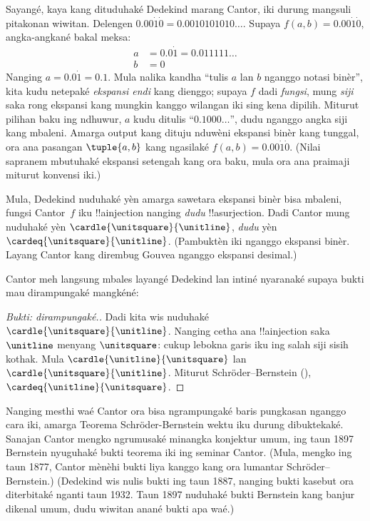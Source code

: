 \documentclass[../../../include/open-logic-section]{subfiles}
\begin{document}
Sayangé, kaya kang dituduhaké
Dedekind marang Cantor, iki
durung mangsuli pitakonan
wiwitan. Delengen $0.00\dot{1}\dot{0} =
0.0010101010\ldots$.
Supaya $f(a,b) = 0.00\dot{1}\dot{0}$,
angka-angkané bakal meksa:
\begin{align*}
a&= 0.0\dot{1} = 0.011111\ldots\\
b&= 0
\end{align*}
Nanging $a = 0.0\dot{1} = 0.1$.
Mula nalika kandha ``tulis
$a$ lan $b$ nganggo notasi
binèr'', kita kudu netepaké
\emph{ekspansi endi} kang
dienggo; supaya $f$ dadi
\emph{fungsi}, mung
\emph{siji} saka rong
ekspansi kang mungkin
kanggo wilangan iki
sing kena dipilih.
Miturut pilihan baku
ing ndhuwur, $a$
kudu ditulis
``$0.1000\ldots$'',
dudu nganggo angka siji
kang mbaleni. Amarga
output kang dituju
nduwèni ekspansi
binèr kang tunggal,
ora ana pasangan
$\tuple{a, b}$ kang
ngasilaké
$f(a, b) = 0.00\dot{1}\dot{0}$.
(Nilai sapranem mbutuhaké ekspansi setengah kang ora baku, mula ora ana praimaji miturut konvensi iki.)

Mula, Dedekind nuduhaké
yèn amarga sawetara
ekspansi binèr bisa
mbaleni, fungsi
Cantor~$f$ iku
!!a{injection}
nanging \emph{dudu}
!!a{surjection}.
Dadi Cantor mung
nuduhaké yèn
$\cardle{\unitsquare}{\unitline}$,
\emph{dudu} yèn
$\cardeq{\unitsquare}{\unitline}$.
(Pambuktèn iki nganggo ekspansi binèr. Layang Cantor kang dirembug Gouvea nganggo ekspansi desimal.)

Cantor meh langsung mbales
layangé Dedekind lan
intiné nyaranaké
supaya bukti mau
dirampungaké mangkéné:

\begin{proof}[Bukti: dirampungaké.]
Dadi kita wis nuduhaké
$\cardle{\unitsquare}{\unitline}$.
Nanging cetha ana
!!a{injection} saka
$\unitline$ menyang
$\unitsquare$: cukup
lebokna garis iku
ing salah siji sisih
kothak. Mula
$\cardle{\unitline}{\unitsquare}$ lan
$\cardle{\unitsquare}{\unitline}$. Miturut Schr\"{o}der--Bernstein
(),
$\cardeq{\unitline}{\unitsquare}$.
\end{proof}

Nanging mesthi waé Cantor ora
bisa ngrampungaké baris
pungkasan nganggo cara iki,
amarga Teorema
Schr\"{o}der-Bernstein
wektu iku durung dibuktekaké.
Sanajan Cantor mengko
ngrumusaké minangka
konjektur umum,
ing taun 1897 Bernstein
nyuguhaké bukti teorema iki
ing seminar Cantor.
(Mula, mengko
ing taun 1877, Cantor
mènèhi bukti liya
kanggo
kang ora lumantar
Schr\"{o}der--Bernstein.)
(Dedekind wis nulis bukti ing taun 1887, nanging bukti kasebut ora diterbitaké nganti taun 1932. Taun 1897 nuduhaké bukti Bernstein kang banjur dikenal umum, dudu wiwitan anané bukti apa waé.)
\end{document}
